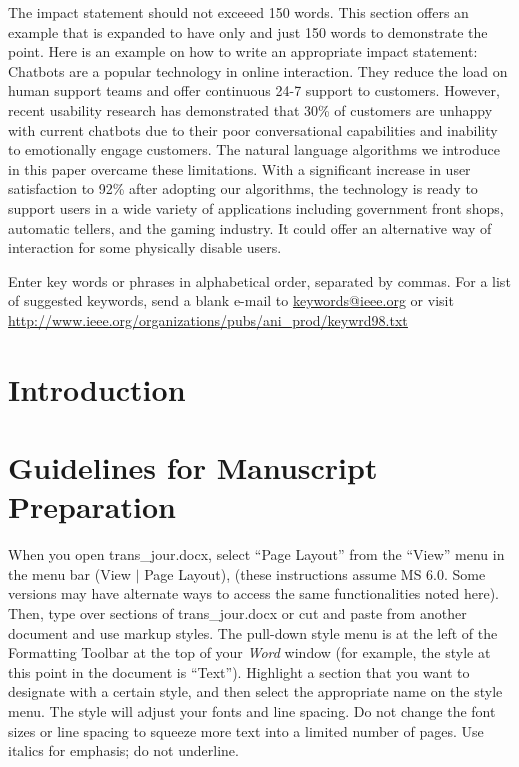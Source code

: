 \documentclass[journal]{IEEEtai}
\begin{document}
\begin{IEEEImpStatement}
The impact statement should not exceeed 150 words. This section offers an example that is expanded to have only and just 150 words to demonstrate the point. Here is an example on how to write an appropriate impact statement: Chatbots are a popular technology in online interaction. They reduce the load on human support teams and offer continuous 24-7 support to customers. However, recent usability research has demonstrated that 30\% of customers are unhappy with current chatbots due to their poor conversational capabilities and inability to emotionally engage customers. The natural language algorithms we introduce in this paper overcame these limitations. With a significant increase in user satisfaction to 92\% after adopting our algorithms, the technology is ready to support users in a wide variety of applications including government front shops, automatic tellers, and the gaming industry. It could offer an alternative way of interaction for some physically disable users.
\end{IEEEImpStatement}

\begin{IEEEkeywords}
Enter key words or phrases in alphabetical order, separated by commas. For a list of suggested keywords, send a blank e-mail to \href{mailto:keywords@ieee.org}{\underline{keywords@ieee.org}} or visit \href{http://www.ieee.org/organizations/pubs/ani_prod/keywrd98.txt}{\underline{http://www.ieee.org/organizations/pubs/ani\_prod/keywrd98.txt}}
\end{IEEEkeywords}



\section{Introduction}



\section{Guidelines for Manuscript Preparation}

When you open trans\_jour.docx, select ``Page Layout'' from the ``View'' menu in the menu bar (View $|$ Page Layout), (these instructions assume MS 6.0. Some versions may have alternate ways to access the same functionalities noted here). Then, type over sections of trans\_jour.docx or cut and paste from another document and use markup styles. The pull-down style menu is at the left of the Formatting Toolbar at the top of your {\it Word} window (for example, the style at this point in the document is ``Text''). Highlight a section that you want to designate with a certain style, and then select the appropriate name on the style menu. The style will adjust your fonts and line spacing. Do not change the font sizes or line spacing to squeeze more text into a limited number of pages. Use italics for emphasis; do not underline.
\end{document}
